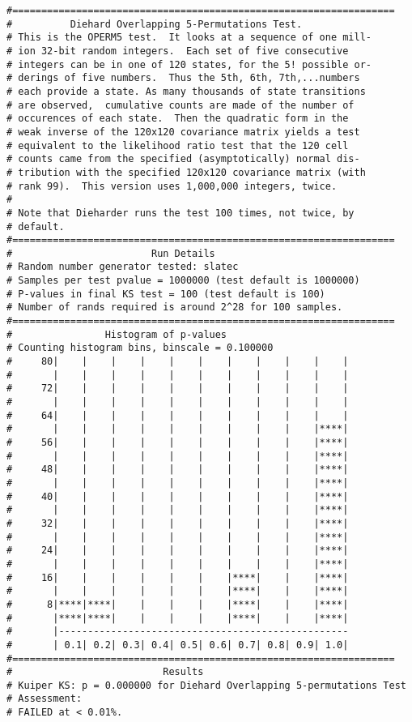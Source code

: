 \documentclass[12pt]{article}
\begin{document}
{\begin{verbatim}
#==================================================================
#          Diehard Overlapping 5-Permutations Test.
# This is the OPERM5 test.  It looks at a sequence of one mill- 
# ion 32-bit random integers.  Each set of five consecutive     
# integers can be in one of 120 states, for the 5! possible or- 
# derings of five numbers.  Thus the 5th, 6th, 7th,...numbers   
# each provide a state. As many thousands of state transitions  
# are observed,  cumulative counts are made of the number of    
# occurences of each state.  Then the quadratic form in the     
# weak inverse of the 120x120 covariance matrix yields a test   
# equivalent to the likelihood ratio test that the 120 cell     
# counts came from the specified (asymptotically) normal dis-   
# tribution with the specified 120x120 covariance matrix (with  
# rank 99).  This version uses 1,000,000 integers, twice.       
#
# Note that Dieharder runs the test 100 times, not twice, by
# default.
#==================================================================
#                        Run Details
# Random number generator tested: slatec
# Samples per test pvalue = 1000000 (test default is 1000000)
# P-values in final KS test = 100 (test default is 100)
# Number of rands required is around 2^28 for 100 samples.
#==================================================================
#                Histogram of p-values
# Counting histogram bins, binscale = 0.100000
#     80|    |    |    |    |    |    |    |    |    |    |
#       |    |    |    |    |    |    |    |    |    |    |
#     72|    |    |    |    |    |    |    |    |    |    |
#       |    |    |    |    |    |    |    |    |    |    |
#     64|    |    |    |    |    |    |    |    |    |    |
#       |    |    |    |    |    |    |    |    |    |****|
#     56|    |    |    |    |    |    |    |    |    |****|
#       |    |    |    |    |    |    |    |    |    |****|
#     48|    |    |    |    |    |    |    |    |    |****|
#       |    |    |    |    |    |    |    |    |    |****|
#     40|    |    |    |    |    |    |    |    |    |****|
#       |    |    |    |    |    |    |    |    |    |****|
#     32|    |    |    |    |    |    |    |    |    |****|
#       |    |    |    |    |    |    |    |    |    |****|
#     24|    |    |    |    |    |    |    |    |    |****|
#       |    |    |    |    |    |    |    |    |    |****|
#     16|    |    |    |    |    |    |****|    |    |****|
#       |    |    |    |    |    |    |****|    |    |****|
#      8|****|****|    |    |    |    |****|    |    |****|
#       |****|****|    |    |    |    |****|    |    |****|
#       |--------------------------------------------------
#       | 0.1| 0.2| 0.3| 0.4| 0.5| 0.6| 0.7| 0.8| 0.9| 1.0|
#==================================================================
#                          Results
# Kuiper KS: p = 0.000000 for Diehard Overlapping 5-permutations Test
# Assessment:
# FAILED at < 0.01%.


\end{verbatim}}
\end{document}
